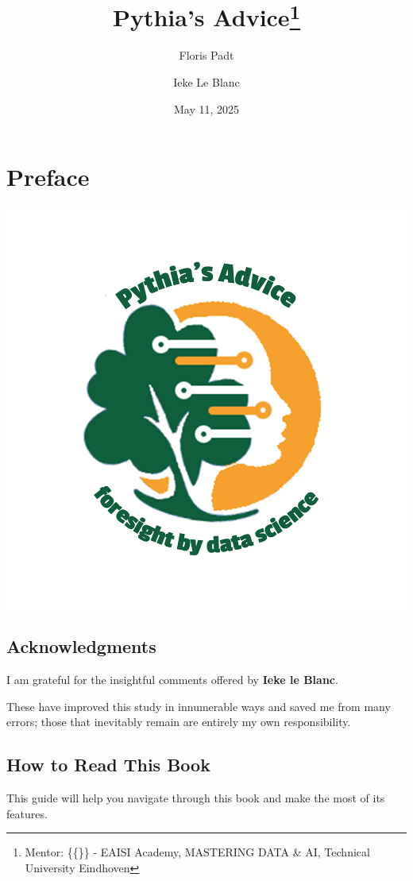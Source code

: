 \documentclass[
  american,
  10,
  a4paper,
]{book}
\title{Pythia's Advice\thanks{Mentor: \{\{\}\} - EAISI Academy,
MASTERING DATA \& AI, Technical University Eindhoven}}
\author{Floris Padt \and Ieke Le Blanc}
\date{May 11, 2025}
\renewcommand*\contentsname{Table of contents}
\newcommand\contentsname{Table of contents}
\theoremstyle{definition}
\theoremstyle{remark}
\begin{document}
\frontmatter
\maketitle

\renewcommand*\contentsname{Table of Contents}
{
\hypersetup{linkcolor=}
\setcounter{tocdepth}{0}
\tableofcontents
}

\mainmatter
{}

\chapter{Preface}\label{preface}

\begin{center}
\includegraphics[width=0.5\linewidth,height=\textheight,keepaspectratio]{images/pythia_logo_cover.png}
\end{center}

\section*{Acknowledgments}\label{acknowledgments}


I am grateful for the insightful comments offered by \textbf{Ieke le
Blanc}.

These have improved this study in innumerable ways and saved me from
many errors; those that inevitably remain are entirely my own
responsibility.

\section{How to Read This Book}\label{how-to-read-this-book}

This guide will help you navigate through this book and make the most of
its features.
\end{document}
